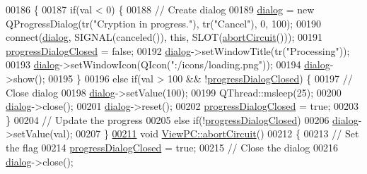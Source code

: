 \begin{DoxyCode}
00186 \{
00187     \textcolor{keywordflow}{if}(val < 0) \{
00188         \textcolor{comment}{// Create dialog}
00189         \hyperlink{class_view_p_c_a31abbb470fe329b44e6ffee202b903ca}{dialog} = \textcolor{keyword}{new} QProgressDialog(tr(\textcolor{stringliteral}{"Cryption in progress."}), tr(\textcolor{stringliteral}{"Cancel"}), 0, 100);
00190         connect(\hyperlink{class_view_p_c_a31abbb470fe329b44e6ffee202b903ca}{dialog}, SIGNAL(canceled()), \textcolor{keyword}{this}, SLOT(\hyperlink{class_view_p_c_ad7ba2fcf1d17862de15e32432823f7b0}{abortCircuit}()));
00191         \hyperlink{class_view_p_c_add8c82aa2b0b934212aa5bde9277ab36}{progressDialogClosed} = \textcolor{keyword}{false};
00192         \hyperlink{class_view_p_c_a31abbb470fe329b44e6ffee202b903ca}{dialog}->setWindowTitle(tr(\textcolor{stringliteral}{"Processing"}));
00193         \hyperlink{class_view_p_c_a31abbb470fe329b44e6ffee202b903ca}{dialog}->setWindowIcon(QIcon(\textcolor{stringliteral}{":/icons/loading.png"}));
00194         \hyperlink{class_view_p_c_a31abbb470fe329b44e6ffee202b903ca}{dialog}->show();
00195     \}
00196     \textcolor{keywordflow}{else} \textcolor{keywordflow}{if}(val > 100 && !\hyperlink{class_view_p_c_add8c82aa2b0b934212aa5bde9277ab36}{progressDialogClosed}) \{
00197         \textcolor{comment}{// Close dialog}
00198         \hyperlink{class_view_p_c_a31abbb470fe329b44e6ffee202b903ca}{dialog}->setValue(100);
00199         QThread::msleep(25);
00200         \hyperlink{class_view_p_c_a31abbb470fe329b44e6ffee202b903ca}{dialog}->close();
00201         \hyperlink{class_view_p_c_a31abbb470fe329b44e6ffee202b903ca}{dialog}->reset();
00202         \hyperlink{class_view_p_c_add8c82aa2b0b934212aa5bde9277ab36}{progressDialogClosed} = \textcolor{keyword}{true};
00203     \}
00204     \textcolor{comment}{// Update the progress}
00205     \textcolor{keywordflow}{else} \textcolor{keywordflow}{if}(!\hyperlink{class_view_p_c_add8c82aa2b0b934212aa5bde9277ab36}{progressDialogClosed})
00206         \hyperlink{class_view_p_c_a31abbb470fe329b44e6ffee202b903ca}{dialog}->setValue(val);
00207 \}
\hypertarget{viewpc_8cpp_source.tex_l00211}{}\hyperlink{class_view_p_c_ad7ba2fcf1d17862de15e32432823f7b0}{00211} \textcolor{keywordtype}{void} \hyperlink{class_view_p_c_ad7ba2fcf1d17862de15e32432823f7b0}{ViewPC::abortCircuit}()
00212 \{
00213     \textcolor{comment}{// Set the flag}
00214     \hyperlink{class_view_p_c_add8c82aa2b0b934212aa5bde9277ab36}{progressDialogClosed} = \textcolor{keyword}{true};
00215     \textcolor{comment}{// Close the dialog}
00216     \hyperlink{class_view_p_c_a31abbb470fe329b44e6ffee202b903ca}{dialog}->close();

\end{DoxyCode}
